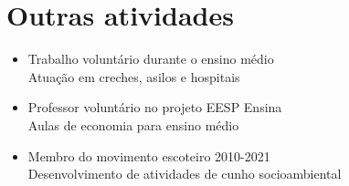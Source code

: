 \documentclass[10pt,letterpaper]{article}
\begin{document}
\section{Outras atividades}
\hspace{-0.6cm}
\begin{minipage}[t]{.47\textwidth}
    \begin{itemize}[itemsep = 0.1cm]
        \item Trabalho voluntário durante o ensino médio\\
        \small \indent Atuação em creches, asilos e hospitais\normalsize
        \item Professor voluntário no projeto EESP Ensina\\
        \small \indent Aulas de economia para ensino médio\normalsize
    \end{itemize}
\end{minipage}
\hfill
\begin{minipage}[t]{.47\textwidth}
    \begin{itemize}[listparindent=\parindent]
        \item Membro do movimento escoteiro 2010-2021\\
        \small  Desenvolvimento de atividades de cunho socioambiental
    \end{itemize}
\end{minipage}
\end{document}
